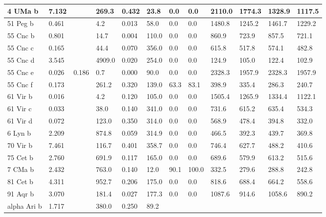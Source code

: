 \documentclass[letterpaper,10pt,english]{sphinxmanual}
\begin{document}
\begin{longtable}{|l|l|l|l|l|l|l|l|l|l|l|l|}
\hline
4 UMa b
 & 
7.132
 &  & 
269.3
 & 
0.432
 & 
23.8
 & 
0.0
 & 
0.0
 & 
2110.0
 & 
1774.3
 & 
1328.9
 & 
1117.5
\\
\hline
51 Peg b
 & 
0.461
 &  & 
4.2
 & 
0.013
 & 
58.0
 & 
0.0
 & 
0.0
 & 
1480.8
 & 
1245.2
 & 
1461.7
 & 
1229.2
\\
\hline
55 Cnc b
 & 
0.801
 &  & 
14.7
 & 
0.004
 & 
110.0
 & 
0.0
 & 
0.0
 & 
860.9
 & 
723.9
 & 
857.5
 & 
721.1
\\
\hline
55 Cnc c
 & 
0.165
 &  & 
44.4
 & 
0.070
 & 
356.0
 & 
0.0
 & 
0.0
 & 
615.8
 & 
517.8
 & 
574.1
 & 
482.8
\\
\hline
55 Cnc d
 & 
3.545
 &  & 
4909.0
 & 
0.020
 & 
254.0
 & 
0.0
 & 
0.0
 & 
124.9
 & 
105.0
 & 
122.4
 & 
102.9
\\
\hline
55 Cnc e
 & 
0.026
 & 
0.186
 & 
0.7
 & 
0.000
 & 
90.0
 & 
0.0
 & 
0.0
 & 
2328.3
 & 
1957.9
 & 
2328.3
 & 
1957.9
\\
\hline
55 Cnc f
 & 
0.173
 &  & 
261.2
 & 
0.320
 & 
139.0
 & 
63.3
 & 
83.1
 & 
398.9
 & 
335.4
 & 
286.3
 & 
240.7
\\
\hline
61 Vir b
 & 
0.016
 &  & 
4.2
 & 
0.120
 & 
105.0
 & 
0.0
 & 
0.0
 & 
1505.4
 & 
1265.9
 & 
1334.4
 & 
1122.1
\\
\hline
61 Vir c
 & 
0.033
 &  & 
38.0
 & 
0.140
 & 
341.0
 & 
0.0
 & 
0.0
 & 
731.6
 & 
615.2
 & 
635.4
 & 
534.3
\\
\hline
61 Vir d
 & 
0.072
 &  & 
123.0
 & 
0.350
 & 
314.0
 & 
0.0
 & 
0.0
 & 
568.9
 & 
478.4
 & 
394.8
 & 
332.0
\\
\hline
6 Lyn b
 & 
2.209
 &  & 
874.8
 & 
0.059
 & 
314.9
 & 
0.0
 & 
0.0
 & 
466.5
 & 
392.3
 & 
439.7
 & 
369.8
\\
\hline
70 Vir b
 & 
7.461
 &  & 
116.7
 & 
0.401
 & 
358.7
 & 
0.0
 & 
0.0
 & 
746.4
 & 
627.7
 & 
488.2
 & 
410.6
\\
\hline
75 Cet b
 & 
2.760
 &  & 
691.9
 & 
0.117
 & 
165.0
 & 
0.0
 & 
0.0
 & 
689.6
 & 
579.9
 & 
613.2
 & 
515.6
\\
\hline
7 CMa b
 & 
2.432
 &  & 
763.0
 & 
0.140
 & 
12.0
 & 
90.1
 & 
100.0
 & 
332.5
 & 
279.6
 & 
288.8
 & 
242.8
\\
\hline
81 Cet b
 & 
4.311
 &  & 
952.7
 & 
0.206
 & 
175.0
 & 
0.0
 & 
0.0
 & 
818.6
 & 
688.4
 & 
664.2
 & 
558.6
\\
\hline
91 Aqr b
 & 
3.070
 &  & 
181.4
 & 
0.027
 & 
177.3
 & 
0.0
 & 
0.0
 & 
1087.6
 & 
914.6
 & 
1058.6
 & 
890.2
\\
\hline
alpha Ari b
 & 
1.717
 &  & 
380.0
 & 
0.250
 & 
89.2

\end{longtable}
\end{document}
